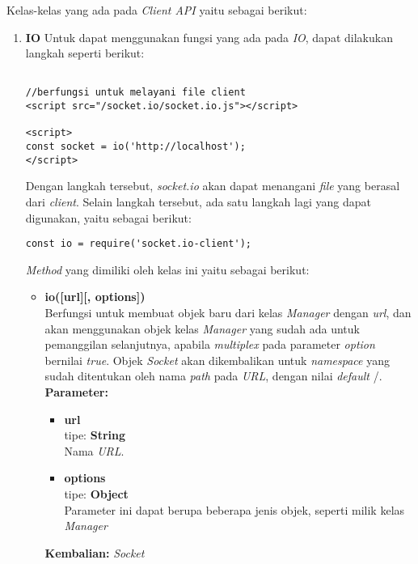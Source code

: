 Kelas-kelas yang ada pada \textit{Client API} yaitu sebagai berikut:
\begin{enumerate}
	\item \textbf{IO}
	Untuk dapat menggunakan fungsi yang ada pada \textit{IO}, dapat dilakukan langkah seperti berikut:
\begin{lstlisting}
	
//berfungsi untuk melayani file client
<script src="/socket.io/socket.io.js"></script>
	
<script>
const socket = io('http://localhost');
</script>
\end{lstlisting}
	Dengan langkah tersebut, \textit{socket.io} akan dapat menangani \textit{file} yang berasal dari \textit{client}. Selain langkah tersebut, ada satu langkah lagi yang dapat digunakan, yaitu sebagai berikut:
\begin{lstlisting}
const io = require('socket.io-client');
\end{lstlisting}
	
	\textit{Method} yang dimiliki oleh kelas ini yaitu sebagai berikut:
	\begin{itemize}
		\item \textbf{io([url][, options])} \\
		Berfungsi untuk membuat objek baru dari kelas \textit{Manager} dengan \textit{url}, dan akan menggunakan objek kelas \textit{Manager} yang sudah ada untuk pemanggilan selanjutnya, apabila \textit{multiplex} pada parameter \textit{option} bernilai \textit{true}. Objek \textit{Socket} akan dikembalikan untuk \textit{namespace} yang sudah ditentukan oleh nama \textit{path} pada \textit{URL}, dengan nilai \textit{default} /. \\
		\textbf{Parameter:}
		\begin{itemize}
			\item \textbf{url} \\tipe: \textbf{String} \\ Nama \textit{URL}.
			\item \textbf{options} \\tipe: \textbf{Object} \\ Parameter ini dapat berupa beberapa jenis objek, seperti milik kelas \textit{Manager}
		\end{itemize}
		\textbf{Kembalian:} \textit{Socket}
		
	\end{itemize}
	

\end{enumerate}
